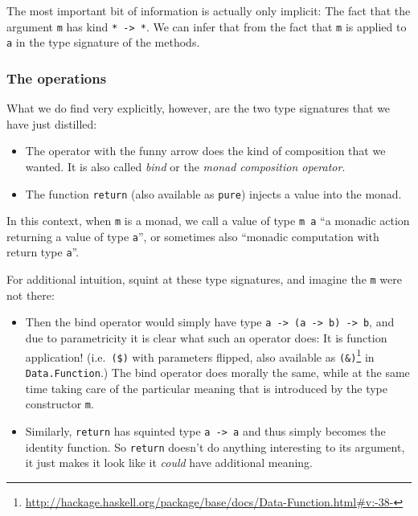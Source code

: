 \documentclass[11pt,
  american,
  DIV13]{article}
\DeclareRobustCommand{\href}[2]{#2\footnote{\url{#1}}}
\providecommand{\tightlist}{%
  \setlength{\itemsep}{0pt}\setlength{\parskip}{0pt}}
\begin{document}
The most important bit of information is actually only implicit: The
fact that the argument \texttt{m} has kind
\texttt{*\ -\textgreater{}\ *}. We can infer that from the fact that
\texttt{m} is applied to \texttt{a} in the type signature of the
methods.

\hypertarget{the-operations}{%
\subsubsection{The operations}\label{the-operations}}

What we do find very explicitly, however, are the two type signatures
that we have just distilled:

\begin{itemize}
\tightlist
\item
  The operator with the funny arrow does the kind of composition that we
  wanted. It is also called \emph{bind} or the \emph{monad composition
  operator}.
\item
  The function \texttt{return} (also available as \texttt{pure}) injects
  a value into the monad.
\end{itemize}

In this context, when \texttt{m} is a monad, we call a value of type
\texttt{m\ a} ``a monadic action returning a value of type \texttt{a}'',
or sometimes also ``monadic computation with return type \texttt{a}''.

For additional intuition, squint at these type signatures, and imagine
the \texttt{m} were not there:

\begin{itemize}
\item
  Then the bind operator would simply have type
  \texttt{a\ -\textgreater{}\ (a\ -\textgreater{}\ b)\ -\textgreater{}\ b},
  and due to parametricity it is clear what such an operator does: It is
  function application! (i.e.~\texttt{(\$)} with parameters flipped,
  also available as
  \href{http://hackage.haskell.org/package/base/docs/Data-Function.html\#v:-38-}{\texttt{(\&)}}
  in \texttt{Data.Function}.) The bind operator does morally the same,
  while at the same time taking care of the particular meaning that is
  introduced by the type constructor \texttt{m}.
\item
  Similarly, \texttt{return} has squinted type
  \texttt{a\ -\textgreater{}\ a} and thus simply becomes the identity
  function. So \texttt{return} doesn't do anything interesting to its
  argument, it just makes it look like it \emph{could} have additional
  meaning.
\end{itemize}
\end{document}
